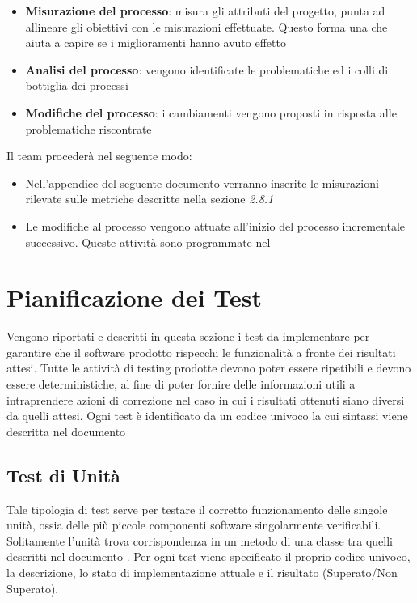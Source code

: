 {  \begin{itemize}
  \item \textbf{Misurazione del processo}: misura gli attributi del progetto, punta ad allineare gli
    obiettivi con le misurazioni effettuate. Questo forma una  che aiuta a capire se i
    miglioramenti hanno avuto effetto
  \item \textbf{Analisi del processo}: vengono identificate le problematiche ed i colli di bottiglia dei
    processi
  \item \textbf{Modifiche del processo}: i cambiamenti vengono proposti in risposta alle problematiche
    riscontrate
  \end{itemize}
  Il team procederà nel seguente modo:
  \begin{itemize}
  \item Nell'appendice del seguente documento verranno inserite le misurazioni
    rilevate sulle metriche descritte nella sezione \emph{2.8.1}
  \item Le modifiche al processo vengono attuate all’inizio del processo incrementale successivo.
    Queste attività sono programmate nel  \emph{\pianodiprogetto}
  \end{itemize}

\section{Pianificazione dei Test}

Vengono riportati e descritti in questa sezione i test da implementare per garantire che il
software prodotto rispecchi le funzionalità a fronte dei risultati attesi. 
Tutte le attività di testing prodotte devono poter essere ripetibili e
devono essere deterministiche, al fine di poter fornire delle
informazioni utili a intraprendere azioni di correzione nel caso in
cui i risultati ottenuti siano diversi da quelli attesi. 
Ogni test è identificato da un codice univoco la cui sintassi viene descritta nel documento \normediprogetto

\subsection{Test di Unità}

Tale tipologia di test serve per testare il corretto funzionamento
delle singole unità, ossia delle più piccole componenti software
singolarmente verificabili. Solitamente l'unità trova corrispondenza
in un metodo di una classe tra quelli descritti nel documento
. Per ogni test viene specificato il proprio
codice univoco, la descrizione, lo stato di implementazione attuale e
il risultato (Superato/Non Superato). 

}
